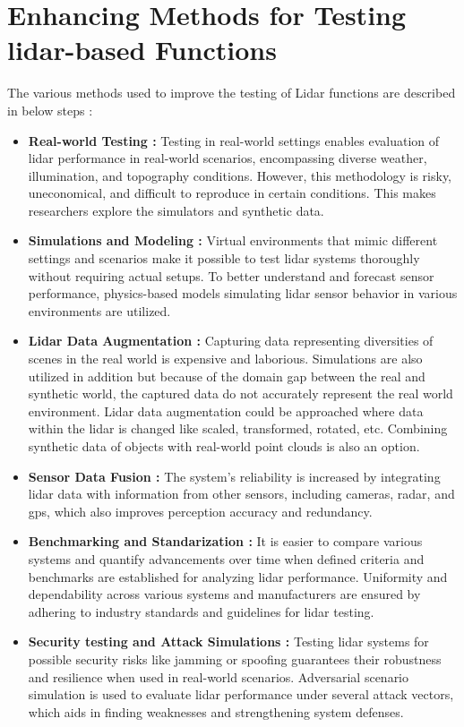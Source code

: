 \section{Enhancing Methods for Testing lidar-based Functions}
The various methods used to improve the testing of Lidar functions are described in below steps :
\begin{itemize}
    \item \textbf{Real-world Testing : }
    Testing in real-world settings enables evaluation of lidar performance in real-world scenarios, encompassing diverse weather, illumination, and topography conditions.  However, this methodology is risky, uneconomical, and difficult to reproduce in certain conditions. This makes researchers explore the simulators and synthetic data.
    \item \textbf{Simulations and Modeling : }
    Virtual environments that mimic different settings and scenarios make it possible to test lidar systems thoroughly without requiring actual setups.  To better understand and forecast sensor performance, physics-based models simulating lidar sensor behavior in various environments are utilized.
    \item \textbf{Lidar Data Augmentation : }
    Capturing data representing diversities of scenes in the real world is expensive and laborious. Simulations are also utilized in addition but because of the domain gap between the real and synthetic world, the captured data do not accurately represent the real world environment. Lidar data augmentation could be approached where data within the lidar is changed like scaled, transformed, rotated, etc. Combining synthetic data of objects with real-world point clouds is also an option.
    \item \textbf{Sensor Data Fusion : }
    The system's reliability is increased by integrating lidar data with information from other sensors, including cameras, radar, and \acrshort{gps}, which also improves perception accuracy and redundancy.
    \item \textbf{Benchmarking and Standarization : }
    It is easier to compare various systems and quantify advancements over time when defined criteria and benchmarks are established for analyzing lidar performance. Uniformity and dependability across various systems and manufacturers are ensured by adhering to industry standards and guidelines for lidar testing.
    \item \textbf{Security testing and Attack Simulations : }
    Testing lidar systems for possible security risks like jamming or spoofing guarantees their robustness and resilience when used in real-world scenarios.  Adversarial scenario simulation is used to evaluate lidar performance under several attack vectors, which aids in finding weaknesses and strengthening system defenses.
\end{itemize}

